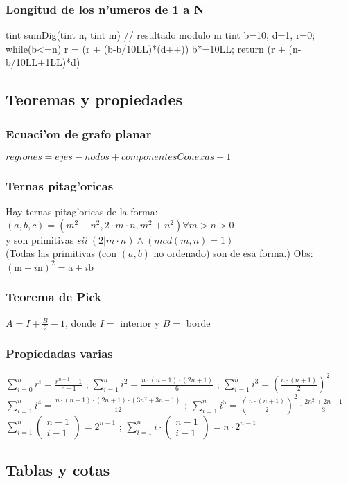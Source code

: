 \documentclass[10pt,landscape,twocolumn,a4paper,notitlepage]{article}
\newcommand{\comb}[2]{\left( \begin{array}{c} #1 \\ #2 \end{array}\right)}
\begin{document}
\subsubsection{Longitud de los n'umeros de 1 a N}%
\begin{code}
tint sumDig(tint n, tint m){ // resultado modulo m
    tint b=10, d=1, r=0;
    while(b<=n){
        r = (r + (b-b/10LL)*(d++))%
        b*=10LL;
    }
    return (r + (n-b/10LL+1LL)*d)%
}
\end{code}
%
\subsection{Teoremas y propiedades}%
\subsubsection{Ecuaci'on de grafo planar}
$regiones = ejes - nodos + componentesConexas + 1$
\subsubsection{Ternas pitag'oricas}
Hay ternas pitag'oricas de la forma: $(a,b,c) = ( m^2-n^2 , 2\cdot m\cdot n, m^2+n^2 ) \forall m > n > 0 $\\
y son primitivas \emph{sii} $(2 | m\cdot n) \land (mcd(m, n) = 1)$\\
(Todas las primitivas (con $(a,b)$ no ordenado) son de esa forma.) Obs: $(\mathrm{m}+i\mathrm{n})^2 = \mathrm{a}+i\mathrm{b}$
\subsubsection{Teorema de Pick}
$A = I + \frac{B}{2} - 1$, donde $I =$ interior y $B =$ borde
%
\subsubsection{Propiedadas varias}
$\sum_{i=0}^n{r^i} = \frac{r^{n+1}-1}{r-1}$ ; $\sum_{i=1}^n{i^2} = \frac{n\cdot(n+1)\cdot(2n+1)}{6}$ ;
$\sum_{i=1}^n{i^3} = \left(\frac{n\cdot(n+1)}{2}\right)^2$ \\
$\sum_{i=1}^n{i^4} = \frac{n\cdot(n+1)\cdot(2n+1)\cdot(3n^2+3n-1)}{12}$ ;
$\sum_{i=1}^{ n} i^5 = \left(\frac{ n \cdot (n+1)}{2}\right) ^2 \cdot \frac{2 n ^2 + 2n - 1}{3}$ \\
%
$\sum_{i=1}^n{\comb{n-1}{i-1}} = 2^{n-1}$ ; $\sum_{i=1}^n{i\cdot\comb{n-1}{i-1}} = n\cdot2^{n-1}$ \\
%
\subsection{Tablas y cotas}
\end{document}
